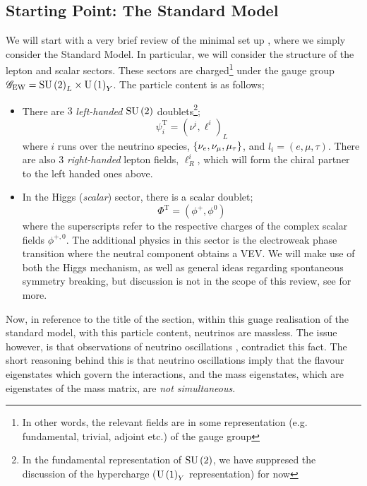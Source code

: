\documentclass[10pt]{article}
\begin{document}
\subsection{Starting Point: The Standard Model}
We will start with a very brief review of the minimal set up \cite{Ma1998}, where we simply consider the Standard Model. In particular, we will consider the structure of the lepton and scalar sectors. These sectors are charged\footnote{In other words, the relevant fields are in some representation (e.g. fundamental, trivial, adjoint etc.) of the gauge group} under the gauge group $\mathscr{G}_{\textrm{EW}} = \textrm{SU}\left(2\right)_L \times \textrm{U}\left(1\right)_Y$. The particle content is as follows;
\begin{itemize}
  \item There are $3$ \textit{left-handed} $\textrm{SU}\left(2\right)$ doublets\footnote{In the fundamental representation of $\textrm{SU}\left(2\right)$, we have suppresed the discussion of the hypercharge ($\textrm{U}\left(1\right)_Y$ representation) for now};
  \begin{equation}
    \psi^{\text{T}}_i = (\nu^i, \ell^i)_L
  \end{equation}
  where $i$ runs over the neutrino species, $\left\{\nu_e, \nu_\mu, \mu_\tau\right\}$, and $l_i = (e, \mu, \tau)$. There are also $3$ \textit{right-handed} lepton fields, $\ell^i_R$, which will form the chiral partner to the left handed ones above.
  \item In the Higgs (\textit{scalar}) sector, there is a scalar doublet;
  \begin{equation}
    \Phi^{\textrm{T}} = (\phi^+, \phi^0)
  \end{equation}
  where the superscripts refer to the respective charges of the complex scalar fields $\phi^{+,0}$. The additional physics in this sector is the electroweak phase transition where the neutral component obtains a VEV. We will make use of both the Higgs mechanism, as well as general ideas regarding spontaneous symmetry breaking, but discussion is not in the scope of this review, see \cite{Bednyakov2007} for more.
\end{itemize}
Now, in reference to the title of the section, within this guage realisation of the standard model, with this particle content, neutrinos are massless. The issue however, is that observations of neutrino oscillations \cite{Bellini2018}, contradict this fact. The short reasoning behind this is that neutrino oscillations imply that the flavour eigenstates which govern the interactions, and the mass eigenstates, which are eigenstates of the mass matrix, are \textit{not simultaneous}.
\end{document}
